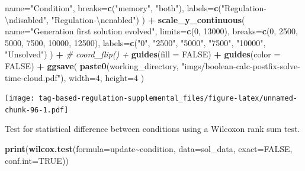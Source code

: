 \documentclass[
]{book}
\newenvironment{Shaded}{\begin{snugshade}}{\end{snugshade}}
\newcommand{\CharTok}[1]{\textcolor[rgb]{0.31,0.60,0.02}{#1}}
\newcommand{\CommentTok}[1]{\textcolor[rgb]{0.56,0.35,0.01}{\textit{#1}}}
\newcommand{\DataTypeTok}[1]{\textcolor[rgb]{0.13,0.29,0.53}{#1}}
\newcommand{\DecValTok}[1]{\textcolor[rgb]{0.00,0.00,0.81}{#1}}
\newcommand{\KeywordTok}[1]{\textcolor[rgb]{0.13,0.29,0.53}{\textbf{#1}}}
\newcommand{\NormalTok}[1]{#1}
\newcommand{\OperatorTok}[1]{\textcolor[rgb]{0.81,0.36,0.00}{\textbf{#1}}}
\newcommand{\OtherTok}[1]{\textcolor[rgb]{0.56,0.35,0.01}{#1}}
\newcommand{\StringTok}[1]{\textcolor[rgb]{0.31,0.60,0.02}{#1}}
\begin{document}
\begin{Shaded}
\begin{Highlighting}[]
    \DataTypeTok{name=}\StringTok{"Condition"}\NormalTok{,}
    \DataTypeTok{breaks=}\KeywordTok{c}\NormalTok{(}\StringTok{"memory"}\NormalTok{, }\StringTok{"both"}\NormalTok{),}
    \DataTypeTok{labels=}\KeywordTok{c}\NormalTok{(}\StringTok{"Regulation{-}}\CharTok{\textbackslash{}n}\StringTok{disabled"}\NormalTok{, }\StringTok{"Regulation{-}}\CharTok{\textbackslash{}n}\StringTok{enabled"}\NormalTok{)}
\NormalTok{  ) }\OperatorTok{+}
\StringTok{  }\KeywordTok{scale\_y\_continuous}\NormalTok{(}
    \DataTypeTok{name=}\StringTok{"Generation first solution evolved"}\NormalTok{,}
    \DataTypeTok{limits=}\KeywordTok{c}\NormalTok{(}\DecValTok{0}\NormalTok{, }\DecValTok{13000}\NormalTok{),}
    \DataTypeTok{breaks=}\KeywordTok{c}\NormalTok{(}\DecValTok{0}\NormalTok{, }\DecValTok{2500}\NormalTok{, }\DecValTok{5000}\NormalTok{, }\DecValTok{7500}\NormalTok{, }\DecValTok{10000}\NormalTok{, }\DecValTok{12500}\NormalTok{),}
    \DataTypeTok{labels=}\KeywordTok{c}\NormalTok{(}\StringTok{"0"}\NormalTok{, }\StringTok{"2500"}\NormalTok{, }\StringTok{"5000"}\NormalTok{, }\StringTok{"7500"}\NormalTok{, }\StringTok{"10000"}\NormalTok{, }\StringTok{"Unsolved"}\NormalTok{)}
\NormalTok{  ) }\OperatorTok{+}
\StringTok{  }\CommentTok{\# coord\_flip() +}
\StringTok{  }\KeywordTok{guides}\NormalTok{(}\DataTypeTok{fill =} \OtherTok{FALSE}\NormalTok{) }\OperatorTok{+}
\StringTok{  }\KeywordTok{guides}\NormalTok{(}\DataTypeTok{color =} \OtherTok{FALSE}\NormalTok{) }\OperatorTok{+}
\StringTok{  }\KeywordTok{ggsave}\NormalTok{(}
    \KeywordTok{paste0}\NormalTok{(working\_directory, }\StringTok{"imgs/boolean{-}calc{-}postfix{-}solve{-}time{-}cloud.pdf"}\NormalTok{),}
    \DataTypeTok{width=}\DecValTok{4}\NormalTok{,}
    \DataTypeTok{height=}\DecValTok{4}
\NormalTok{  )}
\end{Highlighting}
\end{Shaded}

\texttt{[image: tag-based-regulation-supplemental\_files/figure-latex/unnamed-chunk-96-1.pdf]}

Test for statistical difference between conditions using a Wilcoxon rank sum test.

\begin{Shaded}
\begin{Highlighting}[]
\KeywordTok{print}\NormalTok{(}\KeywordTok{wilcox.test}\NormalTok{(}\DataTypeTok{formula=}\NormalTok{update}\OperatorTok{\textasciitilde{}}\NormalTok{condition, }\DataTypeTok{data=}\NormalTok{sol\_data, }\DataTypeTok{exact=}\OtherTok{FALSE}\NormalTok{, }\DataTypeTok{conf.int=}\OtherTok{TRUE}\NormalTok{))}
\end{Highlighting}
\end{Shaded}
\end{document}
